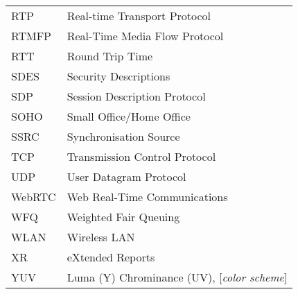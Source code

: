 \begin{longtable}{ll}
RTP 	& Real-time Transport Protocol \\
RTMFP	& Real-Time Media Flow Protocol \\
RTT 	& Round Trip Time \\
SDES	& Security Descriptions \\
SDP 	& Session Description Protocol \\
SOHO 	& Small Office/Home Office \\
SSRC	& Synchronisation Source \\
TCP 	& Transmission Control Protocol \\
UDP 	& User Datagram Protocol \\
WebRTC	& Web Real-Time Communications \\
WFQ 	& Weighted Fair Queuing \\
WLAN	& Wireless LAN \\
XR		& eXtended Reports \\
YUV 	& Luma (Y) Chrominance (UV), [\textit{color scheme}] \\
\end{longtable}
